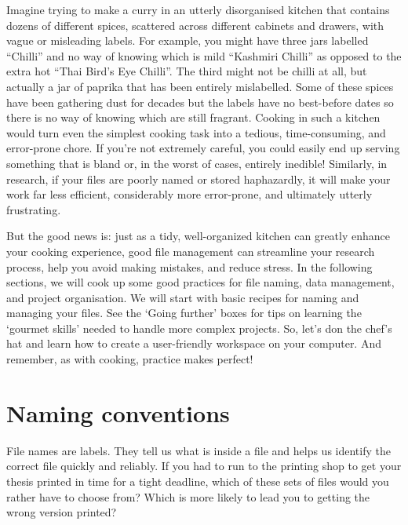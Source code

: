 \documentclass[
  letterpaper,
  DIV=11,
  numbers=noendperiod]{scrreprt}
\begin{document}
Imagine trying to make a curry in an utterly disorganised kitchen that
contains dozens of different spices, scattered across different cabinets
and drawers, with vague or misleading labels. For example, you might
have three jars labelled ``Chilli'' and no way of knowing which is mild
``Kashmiri Chilli'' as opposed to the extra hot ``Thai Bird's Eye
Chilli''. The third might not be chilli at all, but actually a jar of
paprika that has been entirely mislabelled. Some of these spices have
been gathering dust for decades but the labels have no best-before dates
so there is no way of knowing which are still fragrant. Cooking in such
a kitchen would turn even the simplest cooking task into a tedious,
time-consuming, and error-prone chore. If you're not extremely careful,
you could easily end up serving something that is bland or, in the worst
of cases, entirely inedible! Similarly, in research, if your files are
poorly named or stored haphazardly, it will make your work far less
efficient, considerably more error-prone, and ultimately utterly
frustrating.

But the good news is: just as a tidy, well-organized kitchen can greatly
enhance your cooking experience, good file management can streamline
your research process, help you avoid making mistakes, and reduce
stress. In the following sections, we will cook up some good practices
for file naming, data management, and project organisation. We will
start with basic recipes for naming and managing your files. See the
`Going further' boxes for tips on learning the `gourmet skills' needed
to handle more complex projects. So, let's don the chef's hat and learn
how to create a user-friendly workspace on your computer. And remember,
as with cooking, practice makes perfect! 🧑🏽‍🍳

\section{Naming conventions}\label{naming-conventions}

File names are labels. They tell us what is inside a file and helps us
identify the correct file quickly and reliably. If you had to run to the
printing shop to get your thesis printed in time for a tight deadline,
which of these sets of files would you rather have to choose from? Which
is more likely to lead you to getting the wrong version printed?
\end{document}
